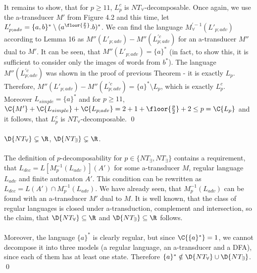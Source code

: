 \paragraph{}
It remains to show, that for $p \geq 11$, $L_p^c$ is $NT_{\forall}$-decomposable. Once again, we use the a-transducer $M'$ from Figure 4.2 and this time, let $L'_{p;adv} = \{a,b\}^* \setminus (a^{\floor{\frac{p}{2}}}.b)^*$. We can find the language $M_{\forall}^{'-1}(L'_{p;adv})$ according to Lemma 16 as $M''(L'_{p;adv}) - M''(L_{p;adv}^{'c})$  for an a-transducer $M''$ dual to $M'$. It can be seen, that $M''(L'_{p;adv}) = \{a\}^*$ (in fact, to show this, it is sufficient to consider only the images of words from $b^*$). The language $M''(L_{p;adv}^{'c})$ was shown in the proof of previous Theorem - it is exactly $L_p$. Therefore, $M''(L'_{p;adv}) - M''(L_{p;adv}^{'c}) = \{a\}^* \setminus L_p$, which is exactly $L_p^c$. Moreover $L_{simple} = \{a\}^*$ and for $p \geq 11$, $\C{M'} + \C{L_{simple}} + \C{L_{p;adv}} = 2 + 1 + \floor{\frac{p}{2}} + 2 \leq p = \C{L_p}$ and it follows, that $L_p^c$ is $NT_{\forall}$-decomposable. \qed

\paragraph{}
\cveta $\D{NT_{\forall}} \subsetneq \R$, $\D{NT_{\exists}} \subsetneq \R$.

\paragraph{}
\dokaz The definition of $p$-decomposability for $p \in \{NT_{\exists},NT_{\exists}\}$ contains a requirement, that $L_{dec} = L[M_{p}^{-1}(L_{adv})](A')$ for some a-transducer $M$, regular language $L_{adv}$ and finite automaton $A'$. This condition can be rewritten as $L_{dec} = L(A') \cap M_{p}^{-1}(L_{adv})$. We have already seen, that $M_{p}^{-1}(L_{adv})$ can be found with an a-transducer $M'$ dual to $M$. It is well known, that the class of regular languages is closed under a-transduction, complement and intersection, so the claim, that $\D{NT_{\forall}} \subseteq \R$ and $\D{NT_{\exists}} \subseteq \R$ follows.

\paragraph{}
Moreover, the language $\{a\}^*$ is clearly regular, but since $\C{\{a\}^*} = 1$, we cannot decompose it into three models (a regular language, an a-transducer and a DFA), since each of them has at least one state. Therefore $\{a\}^* \notin \D{NT_{\forall}} \cup \D{NT_{\exists}}$. \qed


